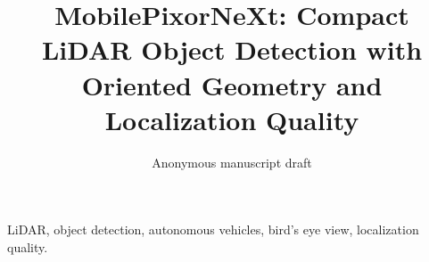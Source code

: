 \documentclass[journal]{IEEEtran}
\title{MobilePixorNeXt: Compact LiDAR Object Detection with Oriented Geometry and Localization Quality}
\author{Anonymous manuscript draft}
\begin{document}
\maketitle

\begin{IEEEkeywords}
LiDAR, object detection, autonomous vehicles, bird's eye view, localization quality.
\end{IEEEkeywords}









\end{document}
